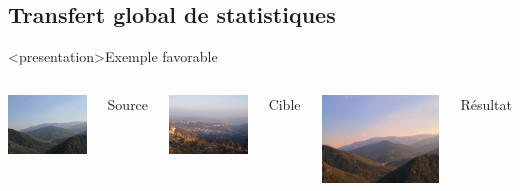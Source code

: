 \subsection<presentation>{Transfert global de statistiques}
\label{sec:res_trans_global}

\begin{frame}<presentation>{Exemple favorable}
  \begin{columns}
    \column{6cm}
    \centering
    \includegraphics[width=4cm]{DSC04659}

    Source

    \vspace{2ex}
    \includegraphics[width=4cm]{P2130173}

    Cible

    \column{6cm}
    \centering
    \includegraphics[width=6cm]{srcDSC04659tgtP2130173}

    Résultat
  \end{columns}
\end{frame}

